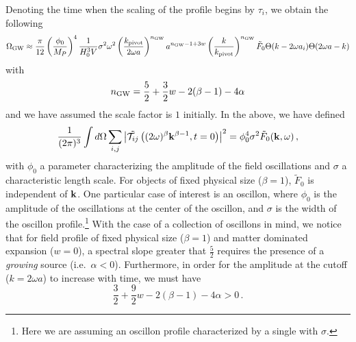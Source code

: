 \documentclass{revtex4}
\begin{document}
Denoting the time when the scaling of the profile begins by $\tau_i$, we obtain the following
\begin{equation}
  \Omega_{\rm GW} \approx \frac{\pi}{12}\left(\frac{\phi_0}{M_P}\right)^4\frac{1}{H_0^3V}\sigma^2\omega^2\left(\frac{k_{\rm pivot}}{2\omega a}\right)^{n_{\rm GW}}a^{n_{\rm GW} - 1 + 3w}\left(\frac{k}{k_{\rm pivot}}\right)^{n_{\rm GW}} \tilde{F}_0 \Theta(k-2\omega a_i)\Theta(2\omega a - k)
\end{equation}
with
\begin{equation}
  n_{\rm GW} = \frac{5}{2} + \frac{3}{2}w - 2(\beta-1) - 4\alpha 
\end{equation}
and we have assumed the scale factor is $1$ initially.
In the above, we have defined
\begin{equation}
  \frac{1}{(2\pi)^3}\int d\Omega \sum_{i,j}\left|\tilde{\mathcal{T}_{ij}}\left((2\omega)^\beta {\bf k}^{\beta-1},t=0\right)\right|^2 = \phi_0^4\sigma^2 \tilde{F}_0({\bf k},\omega) \, ,
\end{equation}
with $\phi_0$ a parameter characterizing the amplitude of the field oscillations and $\sigma$ a characteristic length scale.
For objects of fixed physical size ($\beta=1$), $\tilde{F}_0$ is independent of ${\bf k}$.
One particular case of interest is an oscillon, where $\phi_0$ is the amplitude of the oscillations at the center of the oscillon, and $\sigma$ is the width of the oscillon profile.\footnote{Here we are assuming an oscillon profile characterized by a single with $\sigma$.}
With the case of a collection of oscillons in mind, we notice that for field profile of fixed physical size ($\beta=1$) and matter dominated expansion ($w=0$), a spectral slope greater that $\frac{5}{2}$ requires the presence of a \emph{growing} source (i.e.\ $\alpha < 0$).
Furthermore, in order for the amplitude at the cutoff ($k=2\omega a$) to increase with time, we must have
\begin{equation}
  \frac{3}{2} + \frac{9}{2}w - 2(\beta-1) - 4\alpha > 0 \, .
\end{equation}

\end{document}
